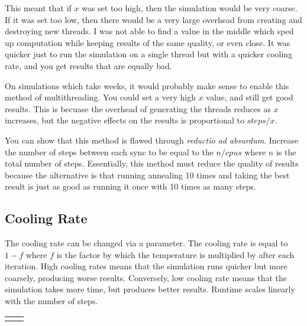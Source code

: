 \documentclass[a4paper, 11pt,table]{article}
\begin{document}
This meant that if $x$ was set too high, then the simulation would be very coarse. If it was set too low, then there would be a very large overhead from creating and destroying new threads. I was not able to find a value in the middle which sped up computation while keeping results of the same quality, or even close. It was quicker just to run the simulation on a single thread but with a quicker cooling rate, and you get results that are equally bad.

On simulations which take weeks, it would probably make sense to enable this method of multithreading. You could set a very high $x$ value, and still get good results. This is becuase the overhead of generating the threads reduces as $x$ increases, but the negative effects on the results is proportional to $steps/x$.

You can show that this method is flawed through \emph{reductio ad absurdum}. Increase the number of steps between each sync to be equal to the $n/cpus$ where $n$ is the total number of steps. Essentially, this method must reduce the quality of results because the alternative is that running annealing 10 times and taking the best result is just as good as running it once with 10 times as many steps.

\subsection{Cooling Rate}
The cooling rate can be changed via a parameter. The cooling rate is equal to $1-f$ where $f$ is the factor by which the temperature is multiplied by after each iteration. High cooling rates means that the simulation runs quicker but more coarsely, producing worse results. Conversely, low cooling rate means that the simulation takes more time, but produces better results. Runtime scales linearly with the number of steps.

\begin{tabu}{X[c] X[c]}
		&
\end{tabu}
\end{document}
